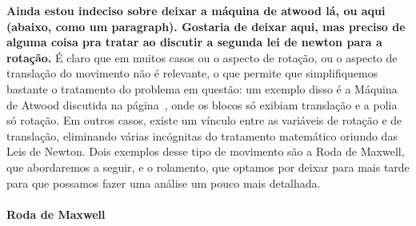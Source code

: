 \textbf{Ainda estou indeciso sobre deixar a máquina de atwood lá, ou aqui (abaixo, como um paragraph). Gostaria de deixar aqui, mas preciso de alguma coisa pra tratar ao discutir a segunda lei de newton para a rotação.}
É claro que em muitos casos ou o aspecto de rotação, ou o aspecto de translação do movimento não é relevante, o que permite que simplifiquemos bastante o tratamento do problema em questão: um exemplo disso é a Máquina de Atwood discutida na página~\pageref{Par:AcelMaqAtwood}, onde os blocos só exibiam translação e a polia só rotação. Em outros casos, existe um vínculo entre as variáveis de rotação e de translação, eliminando várias incógnitas do tratamento matemático oriundo das Leis de Newton. Dois exemplos desse tipo de movimento são a Roda de Maxwell, que abordaremos a seguir, e o rolamento, que optamos por deixar para mais tarde para que possamos fazer uma análise um pouco mais detalhada.

\paragraph{Roda de Maxwell}

